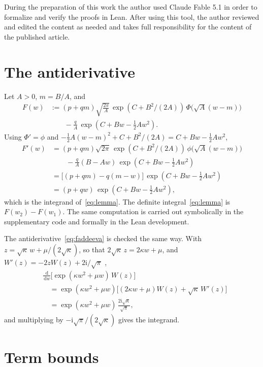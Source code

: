 \documentclass[final,5p,times,twocolumn,authoryear]{elsarticle}
\newcommand{\dd}{\,\mathrm{d}}
\newcommand{\I}{\mathrm{i}}
\begin{document}
During the preparation of this work the author used Claude Fable 5.1 in order to formalize and verify the proofs in Lean. After using this tool, the author reviewed and edited the content as needed and takes full responsibility for the content of the published article.

\appendix

\section{The antiderivative}
\label{app:lemma}

Let $A > 0$, $m = B/A$, and
\begin{align*}
F(w) &:= (p + q m)\sqrt{\frac{2\pi}{A}}\,\exp(C + B^2/(2A))\,\Phi\!\big(\sqrt{A}(w - m)\big) \\
     &\qquad - \frac{q}{A}\,\exp(C + B w - \tfrac12 A w^2).
\end{align*}
Using $\Phi' = \phi$ and $-\tfrac12 A(w - m)^2 + C + B^2/(2A) = C + Bw - \tfrac12 A w^2$,
\begin{align*}
F'(w) &= (p + q m)\sqrt{2\pi}\,\exp(C + B^2/(2A))\,\phi\!\big(\sqrt{A}(w - m)\big) \\
      &\qquad - \frac{q}{A}(B - A w)\,\exp(C + B w - \tfrac12 A w^2) \\
      &= \big[(p + q m) - q(m - w)\big]\,\exp(C + B w - \tfrac12 A w^2) \\
      &= (p + q w)\,\exp(C + B w - \tfrac12 A w^2),
\end{align*}
which is the integrand of~\eqref{eq:lemma}. The definite integral~\eqref{eq:lemma} is $F(w_2) - F(w_1)$. The same computation is carried out symbolically in the supplementary code and formally in the Lean development.

The antiderivative~\eqref{eq:faddeeva} is checked the same way. With $z = \sqrt{\kappa}\,w + \mu/(2\sqrt\kappa)$, so that $2\sqrt{\kappa}\,z = 2\kappa w + \mu$, and $W'(z) = -2zW(z) + 2\I/\sqrt\pi$ \citep[Eq.~7.1.20]{AbramowitzStegun1964},
\begin{align*}
&\frac{\dd}{\dd w}\Big[\exp(\kappa w^2 + \mu w)\,W(z)\Big] \\
 &\quad = \exp(\kappa w^2 + \mu w)\big[(2\kappa w + \mu)W(z) + \sqrt{\kappa}\,W'(z)\big] \\
 &\quad = \exp(\kappa w^2 + \mu w)\,\frac{2\I\sqrt{\kappa}}{\sqrt\pi},
\end{align*}
and multiplying by $-\I\sqrt\pi/(2\sqrt\kappa)$ gives the integrand.

\section{Term bounds}
\label{app:bound}
\end{document}
